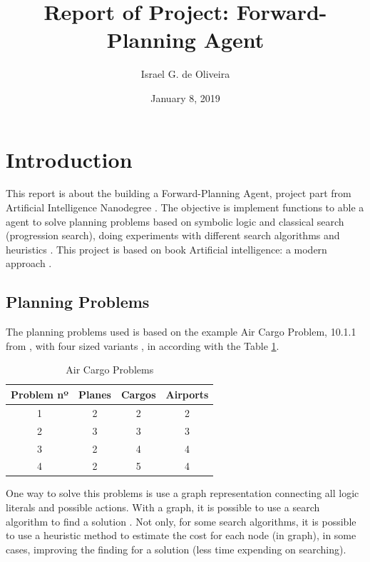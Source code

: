 \documentclass[a4paper]{article}
\title{Report of Project: Forward-Planning Agent}
\author{Israel G. de Oliveira}
\date{January 8, 2019}
\begin{document}
\maketitle

\section{Introduction}
This report is about the building a Forward-Planning Agent, project part from Artificial Intelligence Nanodegree \cite{githubUdacityAIND}. The objective is implement functions to able a agent to solve planning problems based on symbolic logic and classical search (progression search), doing experiments with different search algorithms and heuristics \cite{githubUdacityAINDProj2}. This project is based on book Artificial intelligence: a modern approach \cite{russell2009artificial}.

\subsection{Planning Problems}

The planning problems used is based on the example Air Cargo Problem, 10.1.1 from \cite{russell2009artificial}, with four sized variants \cite{githubUdacityAINDProj2}, in according with the Table \ref{airps}. 

\begin{table}[htpb]
   \caption{ Air Cargo Problems}
    \label{tab:cronograma}
    \centering
        \begin{tabular}{ c | c | c | c}
           Problem nº & Planes & Cargos & Airports \\\hline
           1          & 2      & 2      & 2 \\
           2          & 3      & 3      & 3 \\
           3          & 2      & 4      & 4 \\
           4          & 2      & 5      & 4 \\\hline
        \end{tabular}
        \label{airps}
\end{table}

One way to solve this problems is use a graph representation connecting all logic literals and possible actions. With a graph, it is possible to use a search algorithm to find a solution \cite{russell2009artificial}. Not only, for some search algorithms, it is possible to use a heuristic method to estimate the cost for each node (in graph), in some cases, improving the finding for a solution (less time expending on searching).
\end{document}

